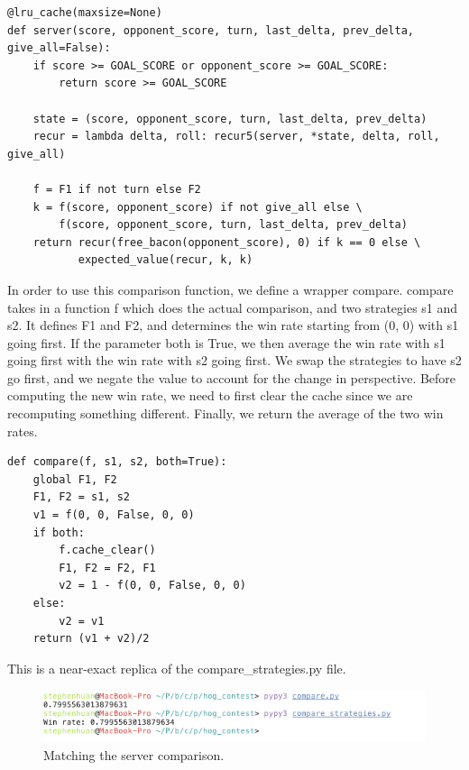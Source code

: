 \documentclass[11pt, oneside]{article}
\begin{document}
\begin{verbatim}
@lru_cache(maxsize=None)
def server(score, opponent_score, turn, last_delta, prev_delta, give_all=False):
    if score >= GOAL_SCORE or opponent_score >= GOAL_SCORE:
        return score >= GOAL_SCORE

    state = (score, opponent_score, turn, last_delta, prev_delta)
    recur = lambda delta, roll: recur5(server, *state, delta, roll, give_all)

    f = F1 if not turn else F2
    k = f(score, opponent_score) if not give_all else \
        f(score, opponent_score, turn, last_delta, prev_delta)
    return recur(free_bacon(opponent_score), 0) if k == 0 else \
           expected_value(recur, k, k)
\end{verbatim} 

In order to use this comparison function, we define a wrapper compare.
compare takes in a function f which does the actual comparison, 
and two strategies s1 and s2.
It defines F1 and F2, and determines the win rate 
starting from (0, 0) with s1 going first.
If the parameter both is True, we then average the win rate 
with s1 going first with the win rate with s2 going first.
We swap the strategies to have s2 go first, and 
we negate the value to account for the change in perspective.
Before computing the new win rate, we need to first clear the cache 
since we are recomputing something different.
Finally, we return the average of the two win rates.

\begin{verbatim}
def compare(f, s1, s2, both=True):
    global F1, F2
    F1, F2 = s1, s2
    v1 = f(0, 0, False, 0, 0)
    if both:
        f.cache_clear()
        F1, F2 = F2, F1
        v2 = 1 - f(0, 0, False, 0, 0)
    else:
        v2 = v1
    return (v1 + v2)/2 
\end{verbatim} 

This is a near-exact replica of the compare\_strategies.py file.

\begin{figure}[h!]
    \centering
    \includegraphics[scale=0.75]{compare}
    \caption{Matching the server comparison.}
\end{figure}
\end{document}
